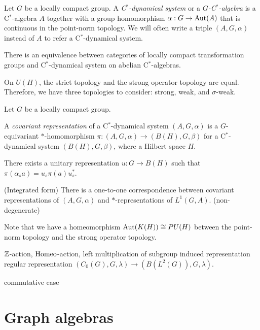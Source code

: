 \documentclass{../../large}
\begin{document}
\begin{prb}
Let $G$ be a locally compact group.
A \emph{C$^*$-dynamical system} or a \emph{$G$-C$^*$-algebra} is a C$^*$-algebra $A$ together with a group homomorphism $\alpha:G\to\operatorname{Aut}(A)$ that is continuous in the point-norm topology.
We will often write a triple $(A,G,\alpha)$ instead of $A$ to refer a C$^*$-dynamical system.
\begin{parts}
\item There is an equivalence between categories of locally compact transformation groups and C$^*$-dynamical system on abelian C$^*$-algebras.
\end{parts}
\end{prb}


On $U(H)$, the strict topology and the strong operator topology are equal.
Therefore, we have three topologies to consider: strong, weak, and $\sigma$-weak.

\begin{prb}
Let $G$ be a locally compact group.

A \emph{covariant representation} of a C$^*$-dynamical system $(A,G,\alpha)$ is a $G$-equivariant $*$-homomorphism $\pi:(A,G,\alpha)\to(B(H),G,\beta)$ for a C$^*$-dynamical system $(B(H),G,\beta)$, where a Hilbert space $H$.
\begin{parts}
\item
There exists a unitary representation $u:G\to B(H)$ such that $\pi(\alpha_sa)=u_s\pi(a)u_s^*$.
\item (Integrated form)
There is a one-to-one correspondence between covariant representations of $(A,G,\alpha)$ and $*$-representations of $L^1(G,A)$. (non-degenerate)
\end{parts}
\end{prb}

Note that we have a homeomorphism $\operatorname{Aut}(K(H))\cong PU(H)$ between the point-norm topology and the strong operator topology.

$\mathbb{Z}$-action, $\operatorname{Homeo}$-action, left multiplication of subgroup
induced representation
regular representation $(C_0(G),G,\lambda)\to(B(L^2(G)),G,\lambda)$.


commutative case




\section{Graph algebras}
\end{document}
